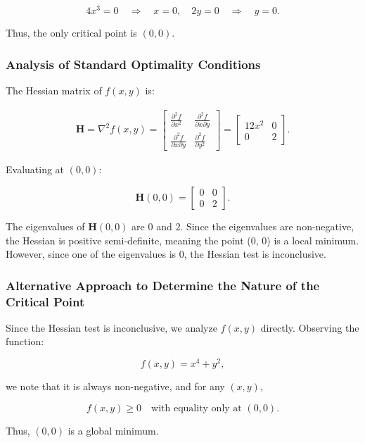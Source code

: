 \documentclass[12pt]{article}
\begin{document}
\[
4x^3 = 0 \quad \Rightarrow \quad x = 0, \quad 2y = 0 \quad \Rightarrow \quad y = 0.
\]

Thus, the only critical point is \( (0,0) \).

\subsubsection{Analysis of Standard Optimality Conditions}

The Hessian matrix of \( f(x, y) \) is:

\begin{align*}
\mathbf{H} = \nabla^2 f(x,y) = 
\begin{bmatrix}
\frac{\partial^2 f}{\partial x^2} & \frac{\partial^2 f}{\partial x \partial y} \\
\frac{\partial^2 f}{\partial x \partial y} & \frac{\partial^2 f}{\partial y^2}
\end{bmatrix}
=
\begin{bmatrix}
12x^2 & 0 \\
0 & 2
\end{bmatrix}.
\end{align*}

Evaluating at \( (0,0) \):

\[
\mathbf{H}(0,0) = 
\begin{bmatrix}
0 & 0 \\
0 & 2
\end{bmatrix}.
\]

The eigenvalues of \( \mathbf{H}(0,0) \) are \( 0 \) and \( 2 \). Since the eigenvalues are non-negative, the Hessian is positive semi-definite, meaning the point (0, 0) is a local minimum. However, since one of the eigenvalues is 0, the Hessian test is inconclusive.

\subsubsection{Alternative Approach to Determine the Nature of the Critical Point}

Since the Hessian test is inconclusive, we analyze \( f(x,y) \) directly. Observing the function:

\[
f(x, y) = x^4 + y^2,
\]

we note that it is always non-negative, and for any \( (x,y) \),

\[
f(x,y) \geq 0 \quad \text{with equality only at } (0,0).
\]

Thus, \( (0,0) \) is a global minimum.
\end{document}
